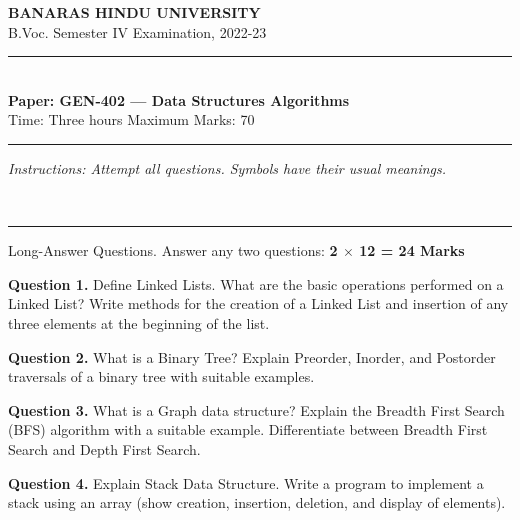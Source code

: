 \documentclass[11pt,a4paper]{article}
\begin{document}
\begin{center}
  {\large\bfseries BANARAS HINDU UNIVERSITY}\\[2pt]
  {\normalsize B.Voc. Semester IV Examination, 2022-23}\\[6pt]
  \rule{0.8\linewidth}{0.5pt}\\[6pt]
  {\large\bfseries Paper: GEN-402 --- Data Structures Algorithms}\\[4pt]
  {\normalsize Time: Three hours \hfill Maximum Marks: 70}
\end{center}

\rule{\linewidth}{0.4pt}

\smallskip



\noindent   \textit{Instructions: Attempt all questions. Symbols have their usual meanings.}

\bigskip




\\[4pt]
\rule{\linewidth}{0.4pt}\smallskip

Long-Answer Questions. Answer any two questions: \hfill   \textbf{2 $ \times$ 12 = 24 Marks}

\medskip



\noindent   \textbf{Question 1.} Define Linked Lists. What are the basic operations performed on a Linked List? Write methods for the creation of a Linked List and insertion of any three elements at the beginning of the list.

\medskip



\noindent   \textbf{Question 2.} What is a Binary Tree? Explain Preorder, Inorder, and Postorder traversals of a binary tree with suitable examples.

\medskip



\noindent   \textbf{Question 3.} What is a Graph data structure? Explain the Breadth First Search (BFS) algorithm with a suitable example. Differentiate between Breadth First Search and Depth First Search.

\medskip



\noindent   \textbf{Question 4.} Explain Stack Data Structure. Write a program to implement a stack using an array (show creation, insertion, deletion, and display of elements).

\bigskip
\end{document}
